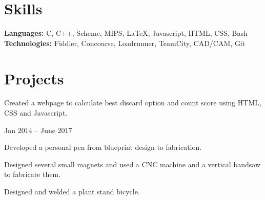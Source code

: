 \documentclass[]{formatting}
\begin{document}
%
%

\vskip 20pt
\sectionsep


\section{Skills}
\begin{flushleft} \textbf{Languages:} 
\textcolor{bold} {C}, \space
\textcolor{bold} {C++}, \space
\textcolor{bold} {Scheme}, \space 
\textcolor{bold} {MIPS}, \space
\textcolor{bold} {\LaTeX}, \space
\textcolor{bold} {Javascript}, \space
\textcolor{bold} {HTML}, \space
\textcolor{bold} {CSS}, \space
\textcolor{bold} {Bash} \\
\vskip 5pt
\textbf{Technologies:} 
\textcolor{bold} {Fiddler}, \space
\textcolor{bold} {Concourse}, \space
\textcolor{bold} {Loadrunner}, \space
\textcolor{bold} {TeamCity}, \space
\textcolor{bold} {CAD/CAM}, \space
\textcolor{bold} {Git}
\end{flushleft}
\sectionsep


\section{Projects}

\begin{tightemize}
\item Created a webpage to calculate best discard option and count score using HTML, CSS and Javascript. 
\end{tightemize}
\sectionsep

 {Jan 2014 – June 2017}
\begin{tightemize}
\item Developed a personal pen from blueprint design to fabrication.
\item Designed several small magnets and used a CNC machine and a vertical bandsaw to fabricate them. 
\item Designed and welded a plant stand bicycle. 
\end{tightemize}
\sectionsep
\end{document}

